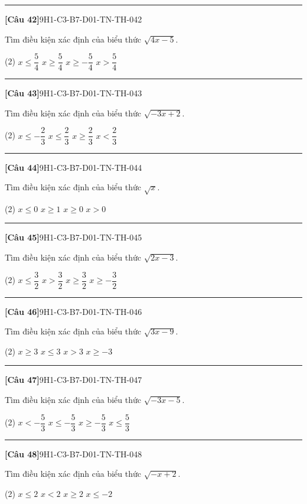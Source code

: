 \documentclass[12pt,a4paper]{article}
\newif\ifloigiai
\newenvironment{cauhoi}[2]{%
  \par\medskip\noindent\rule{\textwidth}{0.4pt}\par\nopagebreak
  \noindent\textbf{[#1]}\hfill{\scriptsize\ttfamily #2}\par\nopagebreak\smallskip}{\par}
\newcommand{\dapan}[1]{\ifloigiai\par\smallskip\noindent\textit{Đáp án:} \textbf{#1}\par\fi}
\begin{document}
\begin{cauhoi}{Câu 42}{9H1-C3-B7-D01-TN-TH-042}
Tìm điều kiện xác định của biểu thức $\sqrt{4x - 5}$.
\begin{tasks}(2)
\task $x\le \dfrac{5}{4}$
\task $x\ge \dfrac{5}{4}$
\task $x\ge -\dfrac{5}{4}$
\task $x>\dfrac{5}{4}$
\end{tasks}
\dapan{B}
\end{cauhoi}
\begin{cauhoi}{Câu 43}{9H1-C3-B7-D01-TN-TH-043}
Tìm điều kiện xác định của biểu thức $\sqrt{-3x + 2}$.
\begin{tasks}(2)
\task $x\le -\dfrac{2}{3}$
\task $x\le \dfrac{2}{3}$
\task $x\ge \dfrac{2}{3}$
\task $x<\dfrac{2}{3}$
\end{tasks}
\dapan{B}
\end{cauhoi}
\begin{cauhoi}{Câu 44}{9H1-C3-B7-D01-TN-TH-044}
Tìm điều kiện xác định của biểu thức $\sqrt{x}$.
\begin{tasks}(2)
\task $x\le 0$
\task $x\ge 1$
\task $x\ge 0$
\task $x>0$
\end{tasks}
\dapan{C}
\end{cauhoi}
\begin{cauhoi}{Câu 45}{9H1-C3-B7-D01-TN-TH-045}
Tìm điều kiện xác định của biểu thức $\sqrt{2x - 3}$.
\begin{tasks}(2)
\task $x\le \dfrac{3}{2}$
\task $x>\dfrac{3}{2}$
\task $x\ge \dfrac{3}{2}$
\task $x\ge -\dfrac{3}{2}$
\end{tasks}
\dapan{C}
\end{cauhoi}
\begin{cauhoi}{Câu 46}{9H1-C3-B7-D01-TN-TH-046}
Tìm điều kiện xác định của biểu thức $\sqrt{3x - 9}$.
\begin{tasks}(2)
\task $x\ge 3$
\task $x\le 3$
\task $x>3$
\task $x\ge -3$
\end{tasks}
\dapan{A}
\end{cauhoi}
\begin{cauhoi}{Câu 47}{9H1-C3-B7-D01-TN-TH-047}
Tìm điều kiện xác định của biểu thức $\sqrt{-3x - 5}$.
\begin{tasks}(2)
\task $x<-\dfrac{5}{3}$
\task $x\le -\dfrac{5}{3}$
\task $x\ge -\dfrac{5}{3}$
\task $x\le \dfrac{5}{3}$
\end{tasks}
\dapan{B}
\end{cauhoi}
\begin{cauhoi}{Câu 48}{9H1-C3-B7-D01-TN-TH-048}
Tìm điều kiện xác định của biểu thức $\sqrt{-x + 2}$.
\begin{tasks}(2)
\task $x\le 2$
\task $x<2$
\task $x\ge 2$
\task $x\le -2$
\end{tasks}
\dapan{A}
\end{cauhoi}
\end{document}
